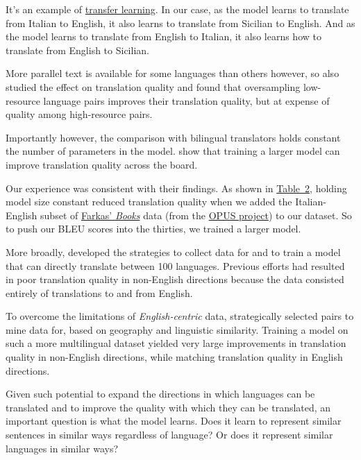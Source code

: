 \documentclass[10pt,letterpaper]{article}
\begin{document}
It's an example of \href{https://en.wikipedia.org/wiki/Transfer_learning}{transfer learning}. 
In our case, as the model learns to translate from Italian to English, it also learns to translate 
from Sicilian to English.  And as the model learns to translate from English to Italian, 
it also learns how to translate from English to Sicilian.
      
More parallel text is available for some languages than others however, so 
\citeauthor{johnson2017zeroshot} also studied the effect on translation quality
and found that oversampling low-resource language pairs improves
their translation quality, but at expense of quality among high-resource pairs.
      
Importantly however, the comparison with bilingual translators holds constant the number of parameters in the model.
\citet{arivazhagan2019massively} show that training a larger model can improve translation quality across the board.

Our experience was consistent with their findings.
As shown in \hyperlink{bleuscores}{Table~2}, %
holding model size constant reduced translation quality when we added 
the Italian-English subset of
\href{https://farkastranslations.com/bilingual_books.php}{Farkas' \textit{Books}} data
(from the \href{https://opus.nlpl.eu/}{OPUS project}) to our dataset.
So to push our BLEU scores into the thirties, we trained a larger model.

More broadly, \citet{fan2020beyond} developed the strategies to collect data for and
to train a model that can directly translate between 100 languages.
Previous efforts had resulted in poor translation quality in
non-English directions because the data consisted entirely of translations to and from English.

To overcome the limitations of \textit{English-centric} data, \citeauthor{fan2020beyond}
strategically selected pairs to mine data for, based on geography and linguistic similarity.
Training a model on such a more multilingual dataset yielded very large improvements in translation
quality in non-English directions, while matching translation quality in English directions.
      
Given such potential to expand the directions in which languages can be translated and to improve 
the quality with which they can be translated, an important question is what the model learns.    
Does it learn to represent similar sentences in similar ways regardless of language?
Or does it represent similar languages in similar ways?
\end{document}
